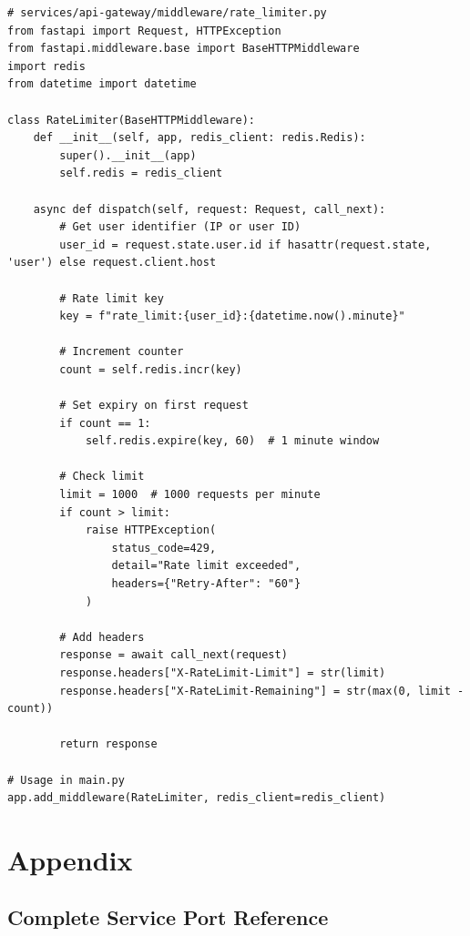 \begin{lstlisting}[style=pythonstyle]
# services/api-gateway/middleware/rate_limiter.py
from fastapi import Request, HTTPException
from fastapi.middleware.base import BaseHTTPMiddleware
import redis
from datetime import datetime

class RateLimiter(BaseHTTPMiddleware):
    def __init__(self, app, redis_client: redis.Redis):
        super().__init__(app)
        self.redis = redis_client
    
    async def dispatch(self, request: Request, call_next):
        # Get user identifier (IP or user ID)
        user_id = request.state.user.id if hasattr(request.state, 'user') else request.client.host
        
        # Rate limit key
        key = f"rate_limit:{user_id}:{datetime.now().minute}"
        
        # Increment counter
        count = self.redis.incr(key)
        
        # Set expiry on first request
        if count == 1:
            self.redis.expire(key, 60)  # 1 minute window
        
        # Check limit
        limit = 1000  # 1000 requests per minute
        if count > limit:
            raise HTTPException(
                status_code=429,
                detail="Rate limit exceeded",
                headers={"Retry-After": "60"}
            )
        
        # Add headers
        response = await call_next(request)
        response.headers["X-RateLimit-Limit"] = str(limit)
        response.headers["X-RateLimit-Remaining"] = str(max(0, limit - count))
        
        return response

# Usage in main.py
app.add_middleware(RateLimiter, redis_client=redis_client)
\end{lstlisting}

\section{Appendix}

\subsection{Complete Service Port Reference}

